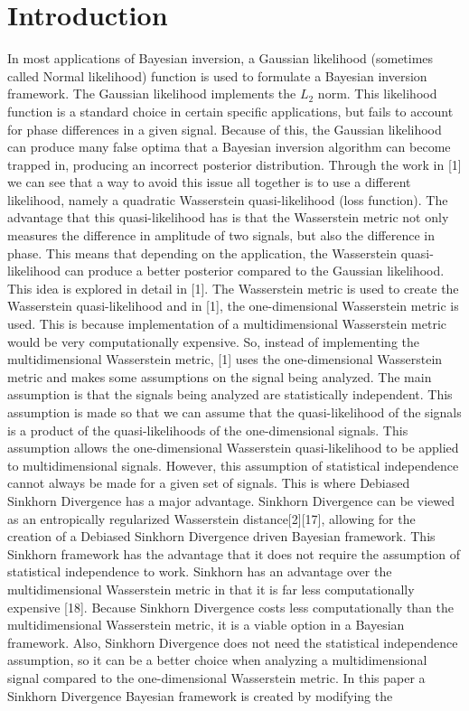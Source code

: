 \documentclass[botnum, fleqn]{unmeethesis}
\begin{document}
\chapter{Introduction}
   In most applications of Bayesian inversion, a Gaussian likelihood (sometimes called Normal likelihood) function is used to formulate a Bayesian inversion framework. The Gaussian likelihood implements the $L_2$ norm. This likelihood function is a standard choice in certain specific applications, but fails to account for phase differences in a given signal. Because of this, the Gaussian likelihood can produce many false optima that a Bayesian inversion algorithm can become trapped in, producing an incorrect posterior distribution. Through the work in [1] we can see that a way to avoid this issue all together is to use a different likelihood, namely a quadratic Wasserstein quasi-likelihood (loss function). The advantage that this quasi-likelihood has is that the Wasserstein metric not only measures the difference in amplitude of two signals, but also the difference in phase. This means that depending on the application, the Wasserstein quasi-likelihood can produce a better posterior compared to the Gaussian likelihood. This idea is explored in detail in [1]. The Wasserstein metric is used to create the Wasserstein quasi-likelihood and in [1], the one-dimensional Wasserstein metric is used. This is because implementation of a multidimensional Wasserstein metric would be very computationally expensive. So, instead of implementing the multidimensional Wasserstein metric, [1] uses the one-dimensional Wasserstein metric and makes some assumptions on the signal being analyzed. The main assumption is that the signals being analyzed are statistically independent. This assumption is made so that we can assume that the quasi-likelihood of the signals is a product of the quasi-likelihoods of the one-dimensional signals. This assumption allows the one-dimensional Wasserstein quasi-likelihood to be applied to multidimensional signals. However, this assumption of statistical independence cannot always be made for a given set of signals. This is where Debiased Sinkhorn Divergence has a major advantage. Sinkhorn Divergence can be viewed as an entropically regularized Wasserstein distance[2][17], allowing for the creation of a Debiased Sinkhorn Divergence driven Bayesian framework. This Sinkhorn framework has the advantage that it does not require the assumption of statistical independence to work. Sinkhorn has an advantage over the multidimensional Wasserstein metric in that it is far less computationally expensive [18]. Because Sinkhorn Divergence costs less computationally than the multidimensional Wasserstein metric, it is a viable option in a Bayesian framework. Also, Sinkhorn Divergence does not need the statistical independence assumption, so it can be a better choice when analyzing a multidimensional signal compared to the one-dimensional Wasserstein metric. In this paper a Sinkhorn Divergence Bayesian framework is created by modifying the 
\end{document}
